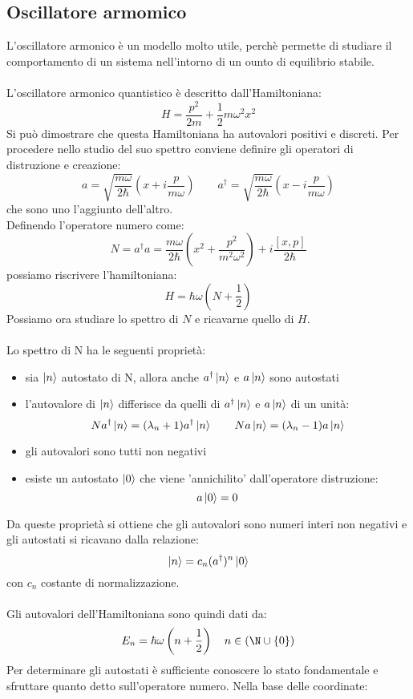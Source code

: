 \documentclass{article}
\begin{document}
\subsection{Oscillatore armomico}
L'oscillatore armonico è un modello molto utile, perchè permette di studiare il comportamento di un sistema nell'intorno di un ounto di equilibrio stabile.\\\\
L'oscillatore armonico quantistico è descritto dall'Hamiltoniana:
$$ H=\frac{p^2}{2m}+\frac{1}{2}m\omega^2x^2 $$
Si può dimostrare che questa Hamiltoniana ha autovalori positivi e discreti. Per procedere nello studio del suo spettro conviene definire gli operatori di distruzione e creazione:
$$ a=\sqrt{\frac{m\omega}{2\hbar}}\left( x+i\frac{p}{m\omega} \right) \qquad a^\dagger=\sqrt{\frac{m\omega}{2\hbar}}\left( x-i\frac{p}{m\omega} \right)$$
che sono uno l'aggiunto dell'altro.\\
Definendo l'operatore numero come:
$$ N=a^\dagger a=\frac{m\omega}{2\hbar}\left( x^2+\frac{p^2}{m^2\omega^2} \right) + i\frac{[x,p]}{2\hbar} $$
possiamo riscrivere l'hamiltoniana:
$$ H=\hbar\omega(N+\frac{1}{2}) $$
Possiamo ora studiare lo spettro di $N$ e ricavarne quello di $H$.\\\\
Lo spettro di N ha le seguenti proprietà:
\begin{itemize}
    \item sia $\ket{n}$ autostato di N, allora anche $a^\dagger\ket{n}$ e $a\ket{n}$ sono autostati
    \item l'autovalore di $\ket{n}$ differisce da quelli di $a^\dagger\ket{n}$ e $a\ket{n}$ di un unità:
    $$ Na^\dagger\ket{n}=(\lambda_n + 1)a^\dagger\ket{n} \qquad Na\ket{n}=(\lambda_n - 1)a\ket{n}$$
    \item gli autovalori sono tutti non negativi
    \item esiste un autostato $\ket{0}$ che viene 'annichilito' dall'operatore distruzione:
    $$ a\ket{0} = 0 $$
\end{itemize}
Da queste proprietà si ottiene che gli autovalori sono numeri interi non negativi e gli autostati si ricavano dalla relazione:
$$ \ket{n}=c_n(a^\dagger)^n\ket{0} $$
con $c_n$ costante di normalizzazione.\\\\
Gli autovalori dell'Hamiltoniana sono quindi dati da:
$$ E_n = \hbar\omega\left( n+\frac{1}{2} \right) \quad n\in(\N\cup \{0\}) $$
Per determinare gli autostati è sufficiente conoscere lo stato fondamentale e sfruttare quanto detto sull'operatore numero. Nella base delle coordinate:
\end{document}
